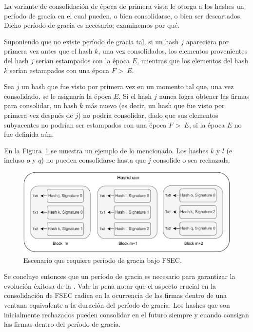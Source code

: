 La variante de consolidación de época de primera vista le otorga a los hashes un período
de gracia en el cual pueden, o bien consolidarse, o bien ser descartados.
%
Dicho período de gracia es necesario; examinemos por qué.


Suponiendo que no existe período de gracia tal, si un hash $j$ apareciera por primera vez
antes que el hash $k$, una vez consolidados, los elementos provenientes del hash $j$
serían estampados con la época $E$, mientras que los elementos del hash $k$ serían estampados
con una época $F$ \textgreater \ $E$.
%

Sea $j$ un hash que fue visto por primera vez en un momento tal que, una vez consolidado,
se le asignaría la época $E$.
%
Si el hash $j$ nunca logra obtener las \SPH firmas para
consolidar, un hash $k$ más nuevo (es decir, un hash que fue visto por primera vez
después de $j$) no podría consolidar, dado que sus elementos subyacentes no podrían ser
estampados con una época $F$ \textgreater \ $E$, si la época $E$ no fue definida aún.
%

En la Figura~\ref{fig:grace_period} se muestra un ejemplo de lo mencionado. Los hashes
$k$ y $l$ (e incluso $o$ y $q$) no pueden consolidarse hasta que $j$ consolide o sea rechazada.

\begin{figure}
  \centering
  \includegraphics[scale=0.7]{figures/grace_period.pdf}
  \caption{Escenario que requiere período de gracia bajo FSEC.}
  \label{fig:grace_period}
\end{figure}

%
Se concluye entonces que un período de gracia es necesario para garantizar la evolución
éxitosa de la \hashchain. 
%
Vale la pena notar que el aspecto crucial en la consolidación de FSEC radica en la ocurrencia
de las \SPH firmas dentro de una ventana equivalente a la duración
del período de gracia.
%
Los hashes que son inicialmente rechazados pueden consolidar en el futuro siempre y cuando
consigan las \SPH firmas dentro del período de gracia.
%

